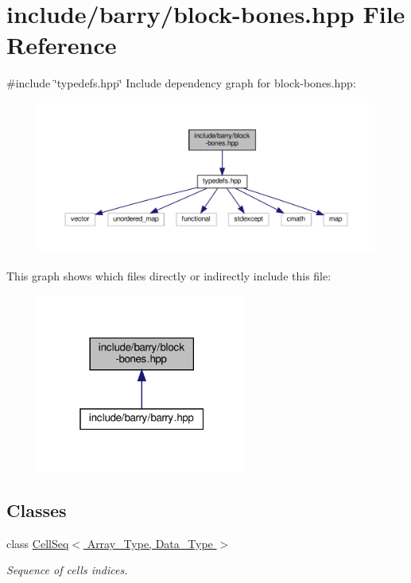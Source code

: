 \hypertarget{block-bones_8hpp}{}\section{include/barry/block-\/bones.hpp File Reference}
\label{block-bones_8hpp}
{\ttfamily \#include \char`\"{}typedefs.\+hpp\char`\"{}}\newline
Include dependency graph for block-\/bones.hpp\+:
\nopagebreak
\begin{figure}[H]
\begin{center}
\leavevmode
\includegraphics[width=350pt]{block-bones_8hpp__incl}
\end{center}
\end{figure}
This graph shows which files directly or indirectly include this file\+:
\nopagebreak
\begin{figure}[H]
\begin{center}
\leavevmode
\includegraphics[width=196pt]{block-bones_8hpp__dep__incl}
\end{center}
\end{figure}
\subsection*{Classes}
\begin{DoxyCompactItemize}
\item 
class \hyperlink{class_cell_seq}{Cell\+Seq$<$ Array\+\_\+\+Type, Data\+\_\+\+Type $>$}
\begin{DoxyCompactList}\small\item\em Sequence of cells indices. \end{DoxyCompactList}\end{DoxyCompactItemize}

